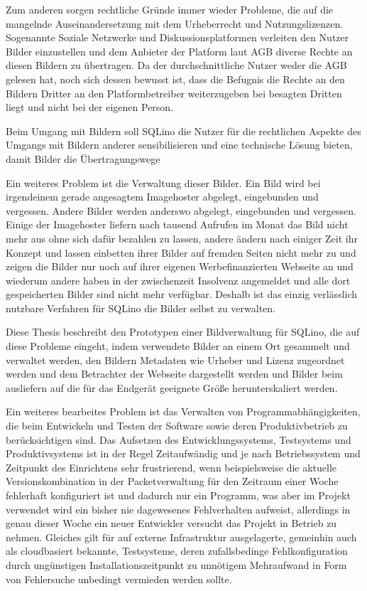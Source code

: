 Zum anderen sorgen rechtliche Gründe immer wieder Probleme, die auf die
mangelnde Auseinandersetzung mit dem Urheberrecht und Nutzungslizenzen.
Sogenannte Soziale Netzwerke und Diskussionsplatformen verleiten den Nutzer
Bilder einzustellen und dem Anbieter der Platform laut AGB diverse Rechte an
diesen Bildern zu übertragen. Da der durchschnittliche Nutzer weder die AGB
gelesen hat, noch sich dessen bewusst ist, dass die Befugnis die Rechte an den
Bildern Dritter an den Platformbetreiber weiterzugeben bei besagten Dritten
liegt und nicht bei der eigenen Person.

Beim Umgang mit Bildern soll SQLino die Nutzer für die rechtlichen Aspekte des
Umgangs mit Bildern anderer sensibilisieren und eine technische Lösung bieten,
damit Bilder die Übertragungswege 

Ein weiteres Problem ist die Verwaltung dieser Bilder. Ein Bild wird bei
irgendeinem gerade angesagtem Imagehoster abgelegt, eingebunden und vergessen.
Andere Bilder werden anderswo abgelegt, eingebunden und vergessen. Einige der
Imagehoster liefern nach tausend Aufrufen im Monat das Bild nicht mehr aus ohne
sich dafür bezahlen zu lassen, andere ändern nach einiger Zeit ihr Konzept und
lassen einbetten ihrer Bilder auf fremden Seiten nicht mehr zu und zeigen die
Bilder nur noch auf ihrer eigenen Werbefinanzierten Webseite an und wiederum
andere haben in der zwischenzeit Insolvenz angemeldet und alle dort
gespeicherten Bilder sind nicht mehr verfügbar. Deshalb ist das einzig
verlässlich nutzbare Verfahren für SQLino die Bilder selbst zu verwalten.

Diese Thesis beschreibt den Prototypen einer Bildverwaltung für SQLino, die auf
diese Probleme eingeht, indem verwendete Bilder an einem Ort gesammelt und
verwaltet werden, den Bildern Metadaten wie Urheber und Lizenz zugeordnet
werden und dem Betrachter der Webseite dargestellt werden und Bilder beim
ausliefern auf die für das Endgerät geeignete Größe herunterskaliert werden.

Ein weiteres bearbeites Problem ist das Verwalten von Programmabhängigkeiten,
die beim Entwickeln und Testen der Software sowie deren Produktivbetrieb zu
berücksichtigen sind. Das Aufsetzen des Entwicklungssystems, Testsystems und
Produktivsystems ist in der Regel Zeitaufwändig und je nach Betriebssystem und
Zeitpunkt des Einrichtens sehr frustrierend, wenn beispielsweise die aktuelle
Versionskombination in der Packetverwaltung für den Zeitraum einer Woche
fehlerhaft konfiguriert ist und dadurch nur ein Programm, was aber im Projekt
verwendet wird ein bisher nie dagewesenes Fehlverhalten aufweist, allerdings in
genau dieser Woche ein neuer Entwickler versucht das Projekt in Betrieb zu
nehmen. Gleiches gilt für auf externe Infrastruktur ausgelagerte, gemeinhin auch
als cloudbasiert bekannte, Testsysteme, deren zufallsbedinge Fehlkonfiguration
durch ungünstigen Installationszeitpunkt zu unnötigem Mehraufwand in Form von
Fehlersuche unbedingt vermieden werden sollte.

